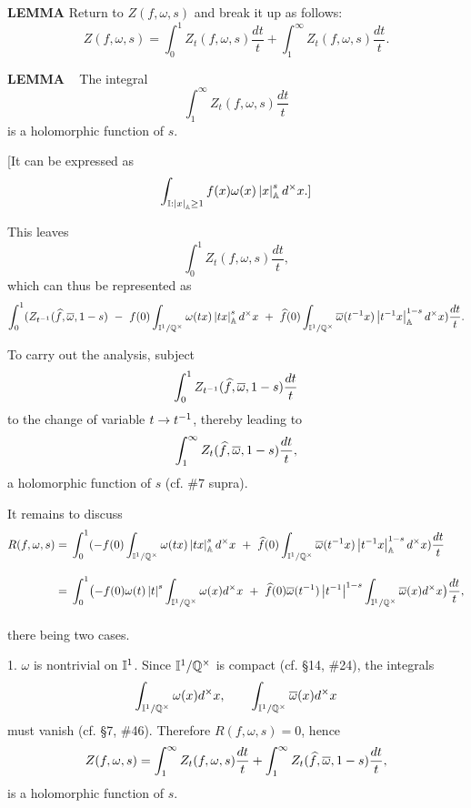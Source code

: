 \begin{x}{\small\bf LEMMA}
Return to $Z(f,\omega,s)$ and break it up as follows:
\[
Z(f,\omega,s) = \int_0^1 Z_t(f,\omega,s) \frac{dt}{t} + \int_1^\infty Z_t(f,\omega,s) \frac{dt}{t}.
\]

\vspace{0.1cm}


\begin{x}{\small\bf LEMMA} \ %
The integral
\[
 \int_1^\infty Z_t(f,\omega,s) \frac{dt}{t}
\]
is a holomorphic function of $s$.

[It can be expressed as
\[
\int_{\mathbb{I} :\left\vert x\right\vert_{\mathbb{A}} \ge 1} f(x)\omega (x) \left\vert x\right\vert_{\mathbb{A}}^s d^\times x.]
\]
\end{x}

\vspace{0.1cm}


This leaves
\[
\int_0^1 Z_t(f,\omega,s) \frac{dt}{t},
\]
which can thus be represented as
\[
\int_0^1 (Z_{t^{-1}}(\widehat{f},\overline{\omega},1-s)  \  - \   f(0) \int_{\mathbb{I}^1/\mathbb{Q}^\times} \omega(tx)  \left\vert tx\right\vert_{\mathbb{A}}^s d^\times x \  + \  \widehat{f}(0) \int_{\mathbb{I}^1/\mathbb{Q}^\times} \overline{\omega}(t^{-1}x)  \left\vert t^{-1}x\right\vert_{\mathbb{A}}^{1-s} d^\times x )\frac{dt}{t}.
\]

To carry out the analysis, subject
\[
\int_0^1 Z_{t^{-1}}(\widehat{f},\overline{\omega},1-s) \frac{dt}{t}
\]
to the change of variable $t \rightarrow t^{-1}$, thereby leading to
\[
\int_1^\infty Z_{t}(\widehat{f},\overline{\omega},1-s) \frac{dt}{t},
\]
a holomorphic function of $s$ (cf. \#7 supra).

\vspace{0.2cm}

It remains to discuss
\begin{align*}
R(f,\omega,s)     	
&=\vsx \int_0^1 (-f(0) \int_{\I^1/\Q^\times} \omega(tx)  \abs{tx}_\A^s d^\times x \  + \  \widehat{f}(0) \int_{\I^1/\Q^\times} \ov{\omega}(t^{-1}x)  \abs{t^{-1}x}_\A^{1-s} d^\times x )\frac{dt}{t}\\
&=\vsx \int_0^1 \bigl(-f(0)\omega(t) \abs{t}^s \int_{\I^1/\Q^\times} \omega(x) d^\times x \  + \  \widehat{f}(0) \ov{\omega}(t^{-1})\abs{t^{-1}}^{1-s} \int_{\I^1/\Q^\times} \ov{\omega}(x) d^\times x \bigr)\frac{dt}{t},
\end{align*}
there being two cases.

\vspace{0.1cm}

1. \quad $\omega$ is nontrivial on $\mathbb{I}^1$.  
Since $\mathbb{I}^1/\mathbb{Q}^\times$ is compact (cf. \S14, \#24), the integrals
\[
\int_{\mathbb{I}^1/\mathbb{Q}^\times} \omega(x) d^\times x, \qquad   \int_{\mathbb{I}^1/\mathbb{Q}^\times} \overline{\omega}(x) d^\times x 
\]
must vanish (cf. \S7, \#46).  
Therefore $R(f,\omega,s) = 0$, hence
\[
Z(f,\omega,s) = \int_1^\infty Z_t(f,\omega,s) \frac{dt}{t} + \int_1^\infty Z_t(\widehat{f},\overline{\omega},1-s) \frac{dt}{t},
\]
is a holomorphic function of $s$.


\end{x}
